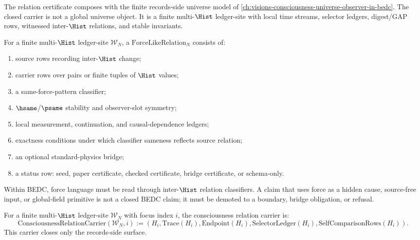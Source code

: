 The relation certificate composes with the finite records-side universe model of \autoref{ch:visions-consciousness-universe-observer-in-bedc}. The closed carrier is not a global universe object. It is a finite multi-$\Hist$ ledger-site with local time streams, selector ledgers, digest/GAP rows, witnessed inter-$\Hist$ relations, and stable invariants.

\begin{definition}
\label{def:layered-relation-force-like-relation}
For a finite multi-$\Hist$ ledger-site $\mathcal{W}_N$, a $\mathrm{ForceLikeRelation}_N$ consists of:
\begin{enumerate}
\item source rows recording inter-$\Hist$ change;
\item carrier rows over pairs or finite tuples of $\Hist$ values;
\item a same-force-pattern classifier;
\item $\hsame$/$\psame$ stability and observer-slot symmetry;
\item local measurement, continuation, and causal-dependence ledgers;
\item exactness conditions under which classifier sameness reflects source relation;
\item an optional standard-physics bridge;
\item a status row: seed, paper certificate, checked certificate, bridge certificate, or schema-only.
\end{enumerate}
\end{definition}

\begin{principle}
\label{prin:layered-relation-force-interhist-classifier}
Within BEDC, force language must be read through inter-$\Hist$ relation classifiers. A claim that uses force as a hidden cause, source-free input, or global-field primitive is not a closed BEDC claim; it must be demoted to a boundary, bridge obligation, or refusal.
\end{principle}

\begin{definition}
\label{def:layered-relation-consciousness-relation-carrier}
For a finite multi-$\Hist$ ledger-site $\mathcal{W}_N$ with focus index $i$, the consciousness relation carrier is:
$$
\mathrm{ConsciousnessRelationCarrier}(\mathcal{W}_N,i)
:=
(H_i,\mathrm{Trace}(H_i),\mathrm{Endpoint}(H_i),
\mathrm{SelectorLedger}(H_i),\mathrm{SelfComparisonRows}(H_i)).
$$
This carrier closes only the records-side surface.
\end{definition}

